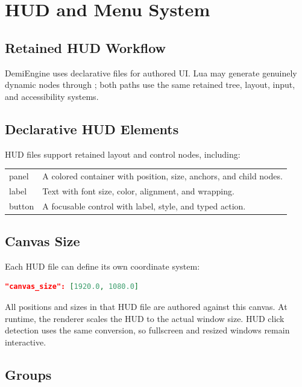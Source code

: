 \chapter{HUD and Menu System}

\section{Retained HUD Workflow}

DemiEngine uses declarative  files for authored UI. Lua
may generate genuinely dynamic nodes through ; both paths use
the same retained tree, layout, input, and accessibility systems.

\section{Declarative HUD Elements}

HUD files support retained layout and control nodes, including:

\begin{longtable}{>{\ttfamily}p{}p{}}
panel & A colored container with position, size, anchors, and child nodes. \\
label & Text with font size, color, alignment, and wrapping. \\
button & A focusable control with label, style, and typed action. \\
\end{longtable}

\section{Canvas Size}

Each HUD file can define its own coordinate system:

\begin{lstlisting}[language=json]
"canvas_size": [1920.0, 1080.0]
\end{lstlisting}

All positions and sizes in that HUD file are authored against this canvas. At runtime, the renderer scales the HUD to the actual window size. HUD click detection uses the same conversion, so fullscreen and resized windows remain interactive.

\section{Groups}

